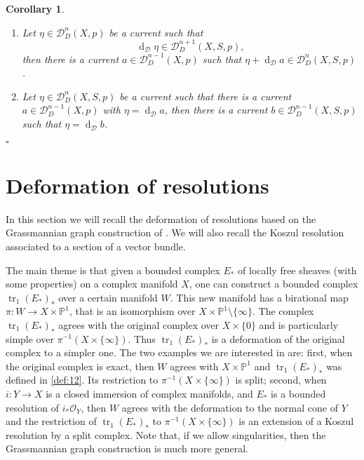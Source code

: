\documentclass[10pt,twoside]{article}
\numberwithin{equation}{section}
\theoremstyle{plain}
\newtheorem{corollary}[equation]{Corollary}
\theoremstyle{definition}
\DeclareMathOperator{\tr}{tr}
\DeclareMathOperator{\dd}{d}
\begin{document}
\begin{corollary} \label{cor:1}
  \begin{enumerate}
  \item Let $\eta\in \mathcal{D}^{n}_{D}(X,p)$ be a current such
    that $$\dd_{\mathcal{D}}\eta \in \mathcal{D}^{n+1}_{D}(X,S,p),$$ then
    there is a current $a\in \mathcal{D}^{n-1}_{D}(X,p)$ such that
    $\eta + \dd_{\mathcal{D}} a\in \mathcal{D}^{n}_{D}(X,S,p)$.
  \item Let $\eta\in \mathcal{D}^{n}_{D}(X,S,p)$ be a current such
    that there is a current $a\in \mathcal{D}^{n-1}_{D}(X,p)$ with 
    $\eta = \dd_{\mathcal{D}} a$, then there is a current $b\in
    \mathcal{D}^{n-1}_{D}(X,S,p)$ such that $\eta = \dd_{\mathcal{D}}
    b$.  
  \end{enumerate}
\hfill $\square$
\end{corollary}

\section{Deformation of resolutions}
\label{sec:deform-resol}

In this section we will recall  the deformation of resolutions based
on the Grassmannian 
graph construction of \cite{BaumFultonMacPherson:RRsv}.  We will
also recall the Koszul resolution associated to a section of a vector
bundle.

The main theme is that given a bounded 
complex $E_{\ast}$ of locally free sheaves (with some properties) on a
complex manifold $X$, one can
construct a bounded complex 
$\tr_{1}(E_{\ast})_{\ast}$ 
over a certain manifold  
$W$. This new manifold has a birational map $\pi \colon W\longrightarrow X\times
\mathbb{P}^{1}$, that is an isomorphism over $X\times \mathbb{P}^{1}\setminus
\{\infty\}$.  
The complex
$\tr_{1}(E_{\ast})_{\ast}$ agrees with the original 
complex over $X\times \{0\} $ and is particularly simple over $\pi^{-1}(X\times
\{\infty\})$. Thus $\tr_{1}(E_{\ast})_{\ast}$ is a
deformation of the original complex to a simpler one. The two
examples we are interested in are: first, when
the original complex is exact, then $W$ 
agrees with $X\times \mathbb{P}^{1}$ and  $\tr_{1}(E_{\ast})_{\ast}$ was
defined in \ref{def:12}. Its restriction
to $\pi^{-1}(X\times \{\infty\})$ is split; second, when $i\colon
Y\longrightarrow 
X$ is a closed immersion of complex manifolds, and $E_{\ast}$ is a bounded
resolution of $i_{\ast}\mathcal{O}_{Y}$, then $W$ agrees with the
deformation to the normal cone of $Y$ and the restriction of
$\tr_{1}(E_{\ast})_{\ast}$ to $\pi^{-1}(X\times \{\infty\})$ is an extension
  of a Koszul resolution by a split complex. Note that, if we allow
  singularities, then the Grassmannian graph construction is much more
  general. 
\end{document}
